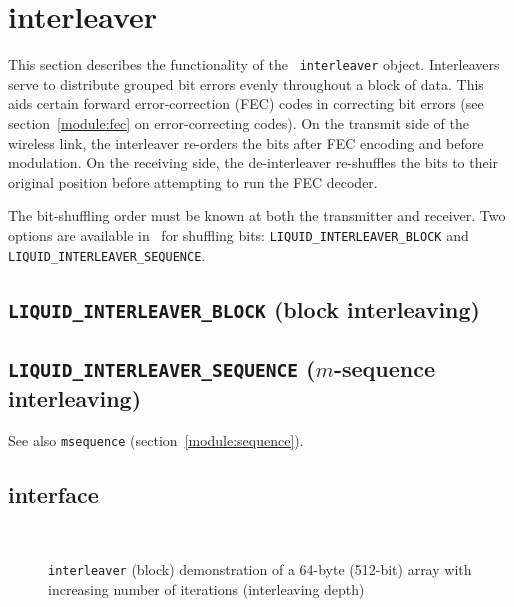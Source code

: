 % 
%

\section{interleaver}
\label{module:interleaver}

This section describes the functionality of the \liquid\
{\tt interleaver} object.
Interleavers serve to distribute grouped bit errors evenly throughout a block
of data.
This aids certain forward error-correction (FEC) codes in correcting
bit errors (see section~\ref{module:fec} on error-correcting codes).
On the transmit side of the wireless link, the interleaver re-orders the bits
after FEC encoding and before modulation.
On the receiving side, the de-interleaver re-shuffles the bits to their
original position before attempting to run the FEC decoder.


The bit-shuffling order must be known at both the transmitter and receiver.
Two options are available in \liquid\ for shuffling bits:
{\tt LIQUID\_INTERLEAVER\_BLOCK} and {\tt LIQUID\_INTERLEAVER\_SEQUENCE}.

\subsection{{\tt LIQUID\_INTERLEAVER\_BLOCK} (block interleaving)}
\label{module:interleaver:block}

\subsection{{\tt LIQUID\_INTERLEAVER\_SEQUENCE} ($m$-sequence interleaving)}
\label{module:interleaver:sequence}
See also {\tt msequence} (section~\ref{module:sequence}).

\subsection{interface}
\label{module:interleaver:interface}

\begin{figure}
\centering
\mbox{
   \quad
   \quad
}
\mbox{
   \quad
   \quad
}
\caption{{\tt interleaver} (block) demonstration of a 64-byte (512-bit) array
with increasing number of iterations (interleaving depth)}
\label{fig:module:interleaver:scatterplot}
\end{figure}


